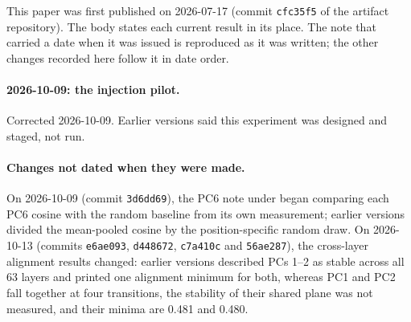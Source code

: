\documentclass[11pt,a4paper]{article}
\begin{document}
This paper was first published on 2026-07-17 (commit \texttt{cfc35f5} of the artifact repository). The body states each current result in its place. The note that carried a date when it was issued is reproduced as it was written; the other changes recorded here follow it in date order.

\paragraph{2026-10-09: the injection pilot.}
Corrected 2026-10-09. Earlier versions said this experiment was designed and staged, not run.

\paragraph{Changes not dated when they were made.}
On 2026-10-09 (commit \texttt{3d6dd69}), the PC6 note under  began comparing each PC6 cosine with the random baseline from its own measurement; earlier versions divided the mean-pooled cosine by the position-specific random draw. On 2026-10-13 (commits \texttt{e6ae093}, \texttt{d448672}, \texttt{c7a410c} and \texttt{56ae287}), the cross-layer alignment results changed: earlier versions described PCs 1--2 as stable across all 63 layers and printed one alignment minimum for both, whereas PC1 and PC2 fall together at four transitions, the stability of their shared plane was not measured, and their minima are 0.481 and 0.480.
\end{document}
